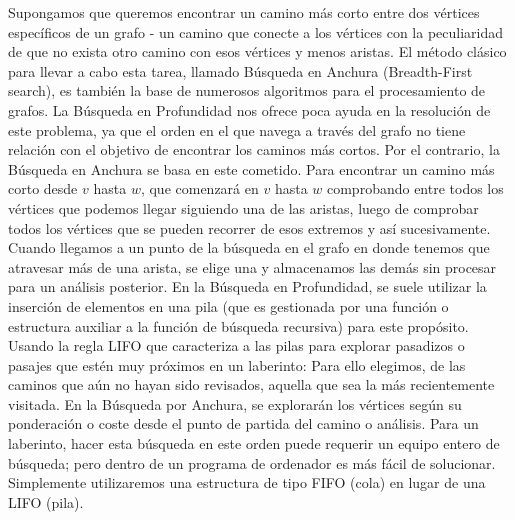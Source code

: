 Supongamos que queremos encontrar un camino más corto entre dos vértices específicos de un grafo - un camino que conecte a los vértices con la peculiaridad de que no exista otro camino con esos vértices y menos aristas. El método clásico para llevar a cabo esta tarea, llamado Búsqueda en Anchura (Breadth-First search), es también la base de numerosos algoritmos para el procesamiento de grafos. La Búsqueda en Profundidad nos ofrece poca ayuda en la resolución de este problema, ya que el orden en el que navega a través del grafo no tiene relación con el objetivo de encontrar los caminos más cortos. Por el contrario, la Búsqueda en Anchura se basa en este cometido. Para encontrar un camino más corto desde $v$ hasta $w$, que comenzará en $v$ hasta $w$ comprobando entre todos los vértices que podemos llegar siguiendo una de las aristas, luego de comprobar todos los vértices que se pueden recorrer de esos extremos y así sucesivamente.\\

Cuando llegamos a un punto de la búsqueda en el grafo en donde tenemos que atravesar más de una arista, se elige una y almacenamos las demás sin procesar para un análisis posterior. En la Búsqueda en Profundidad, se suele utilizar la inserción de elementos en una pila (que es gestionada por una función o estructura auxiliar a la función de búsqueda recursiva) para este propósito. Usando la regla LIFO que caracteriza a las pilas para explorar pasadizos o pasajes que estén muy próximos en un laberinto: Para ello elegimos, de las caminos que aún no hayan sido revisados, aquella que sea la más recientemente visitada. En la Búsqueda por Anchura, se explorarán los vértices según su ponderación o coste desde el punto de partida del camino o análisis. Para un laberinto, hacer esta búsqueda en este orden puede requerir un equipo entero de búsqueda; pero dentro de un programa de ordenador es más fácil de solucionar. Simplemente utilizaremos una estructura de tipo FIFO (cola) en lugar de una LIFO (pila).\\


